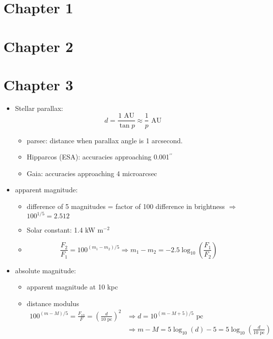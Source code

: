 \documentclass[12pt]{article}
\begin{document}
\section*{Chapter 1}

\section*{Chapter 2}

\section*{Chapter 3}
\begin{itemize}
\item Stellar parallax: 
\begin{equation}
d = \frac{1\text{ AU}}{\tan p} \approx \frac{1}{p}\text{ AU}
\end{equation}
\begin{itemize}
\item parsec: distance when parallax angle is 1 arcsecond.
\item Hipparcos (ESA): accuracies approaching 0.001$^{\prime\prime}$
\item Gaia: accuracies approaching 4 microarcsec
\end{itemize}
\item apparent magnitude:
\begin{itemize}
\item difference of 5 magnitudes = factor of 100 difference in brightness $\Longrightarrow$ $100^{1/5} = 2.512$
\item Solar constant: 1.4 kW m$^{-2}$
\item
\begin{equation}
\frac{F_2}{F_1} = 100^{(m_1-m_2)/5} \Longrightarrow m_1 - m_2 = -2.5\log_{10}\left(\frac{F_1}{F_2}\right)
\end{equation}
\end{itemize}
\item absolute magnitude:
\begin{itemize}
\item apparent magnitude at 10 kpc
\item distance modulus
\begin{align*}
100^{(m - M)/5} = \frac{F_{10}}{F} = \left(\frac{d}{10\text{ pc}}\right)^2 &\Longrightarrow d = 10^{(m - M + 5)/5}\text{ pc} \\
&\Longrightarrow m - M = 5\log_{10}(d) - 5 = 5\log_{10}\left(\frac{d}{10\text{ pc}}\right)
\end{align*}

\end{itemize}
\end{itemize}
\end{document}
